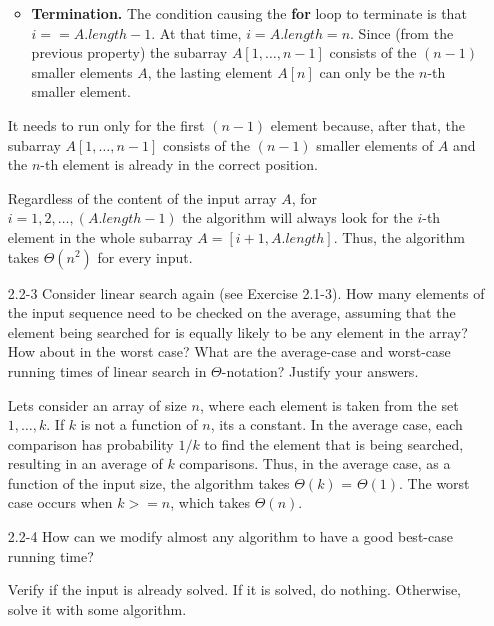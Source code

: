\begin{enumerate}
\begin{framed}
\begin{itemize}
  \item \textbf{Termination.} The condition causing the \textbf{for} loop to
    terminate is that $i == A.length - 1$. At that time, $i = A.length = n$.
    Since (from the previous property) the subarray $A[1, \dots, n - 1]$
    consists of the $(n - 1)$ smaller elements $A$, the lasting element $A[n]$
    can only be the $n$-th smaller element.
\end{itemize}

It needs to run only for the first $(n - 1)$ element because, after that, the
subarray $A[1, \dots, n - 1]$ consists of the $(n - 1)$ smaller elements
of $A$ and the $n$-th element is already in the correct position.

Regardless of the content of the input array $A$, for
$i = 1, 2, \dots, (A.length - 1)$ the algorithm will always look for the $i$-th
element in the whole subarray $A = [i + 1, A.length]$. Thus, the algorithm takes
$\Theta(n^2)$ for every input.
\end{framed}

\item[2.2{-}3]{Consider linear search again (see Exercise 2.1-3). How many
elements of the input sequence need to be checked on the average, assuming
that the element being searched for is equally likely to be any element in
the array? How about in the worst case? What are the average-case and
worst-case running times of linear search in $\Theta$-notation? Justify your
answers.}

\begin{framed}
Lets consider an array of size $n$, where each element is taken from the set $1,
\dots, k$. If $k$ is not a function of $n$, its a constant. In the average case,
each comparison has probability $1/k$ to find the element that is being
searched, resulting in an average of $k$ comparisons. Thus, in the average case,
as a function of the input size, the algorithm takes $\Theta(k)$ = $\Theta(1)$.
The worst case occurs when $k >= n$, which takes $\Theta(n)$.
\end{framed}

\item[2.2{-}4]{How can we modify almost any algorithm to have a good best-case
  running time?}

\begin{framed}
Verify if the input is already solved. If it is solved, do nothing. Otherwise,
solve it with some algorithm.
\end{framed}

\end{enumerate}


